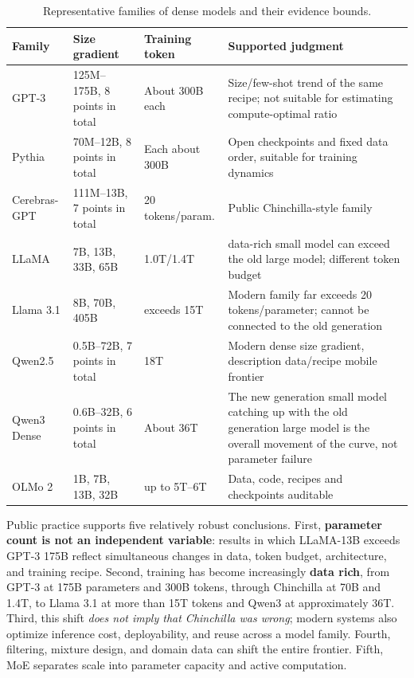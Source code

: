\documentclass[UTF8,10pt,a4paper,fontset=none]{ctexart}
\begin{document}
\begin{table}[htbp]
\centering
\small
\caption{Representative families of dense models and their evidence bounds.}
\label{tab:dense-families}
\begin{tabularx}{\textwidth}{p{2.2cm}p{3.9cm}p{2.5cm}Y}
\toprule
Family & Size gradient & Training token & Supported judgment \\
\midrule
GPT-3 & 125M--175B, 8 points in total & About 300B each & Size/few-shot trend of the same recipe; not suitable for estimating compute-optimal ratio \cite{brown2020} \\
Pythia & 70M--12B, 8 points in total & Each about 300B & Open checkpoints and fixed data order, suitable for training dynamics \cite{biderman2023} \\
Cerebras-GPT & 111M--13B, 7 points in total & 20 tokens/param. & Public Chinchilla-style family\cite{cerebrasgpt2023} \\
LLaMA & 7B, 13B, 33B, 65B & 1.0T/1.4T & data-rich small model can exceed the old large model; different token budget \cite{llama2023} \\
Llama 3.1 & 8B, 70B, 405B & exceeds 15T & Modern family far exceeds 20 tokens/parameter; cannot be connected to the old generation \cite{llama31} \\
Qwen2.5 & 0.5B--72B, 7 points in total & 18T & Modern dense size gradient, description data/recipe mobile frontier\cite{qwen25} \\
Qwen3 Dense & 0.6B--32B, 6 points in total & About 36T & The new generation small model catching up with the old generation large model is the overall movement of the curve, not parameter failure \cite{qwen3} \\
OLMo 2 & 1B, 7B, 13B, 32B & up to 5T--6T & Data, code, recipes and checkpoints auditable \cite{olmo2} \\
\bottomrule
\end{tabularx}
\end{table}

Public practice supports five relatively robust conclusions. First, \textbf{parameter count is not an independent variable}: results in which LLaMA-13B exceeds GPT-3 175B reflect simultaneous changes in data, token budget, architecture, and training recipe. Second, training has become increasingly \textbf{data rich}, from GPT-3 at 175B parameters and 300B tokens, through Chinchilla at 70B and 1.4T, to Llama 3.1 at more than 15T tokens and Qwen3 at approximately 36T. Third, this shift \textit{does not imply that Chinchilla was wrong}; modern systems also optimize inference cost, deployability, and reuse across a model family. Fourth, filtering, mixture design, and domain data can shift the entire frontier. Fifth, MoE separates scale into parameter capacity and active computation.
\end{document}
